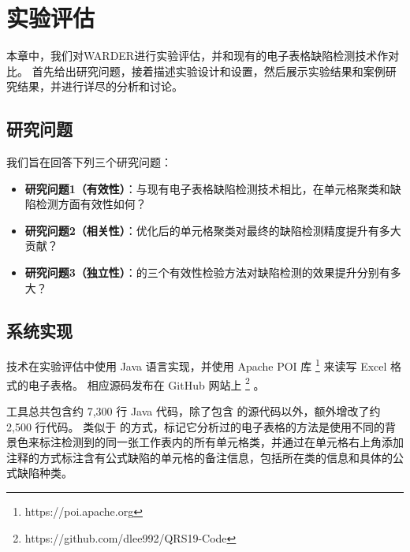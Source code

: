 \chapter{实验评估}

本章中，我们对WARDER进行实验评估，并和现有的电子表格缺陷检测技术作对比。
首先给出研究问题，接着描述实验设计和设置，然后展示实验结果和案例研究结果，并进行详尽的分析和讨论。


\section{研究问题}
我们旨在回答下列三个研究问题：
\begin{itemize}
    \item \textbf{研究问题1（有效性）}：与现有电子表格缺陷检测技术相比，\wa 在单元格聚类和缺陷检测方面有效性如何？
    \item \textbf{研究问题2（相关性）}：\wa 优化后的单元格聚类对最终的缺陷检测精度提升有多大贡献？
    \item \textbf{研究问题3（独立性）}：\wa 的三个有效性检验方法对缺陷检测的效果提升分别有多大？
\end{itemize}

\section{\wa 系统实现}
\wa 技术在实验评估中使用 Java 语言实现，并使用 Apache POI 库 \footnote{https://poi.apache.org} 来读写 Excel 格式的电子表格。
相应源码发布在 GitHub 网站上 \footnote{https://github.com/dlee992/QRS19-Code} 。

\wa 工具总共包含约 7,300 行 Java 代码，除了包含 \cu 的源代码以外，额外增改了约 2,500 行代码。
类似于 \cu 的方式，\wa 标记它分析过的电子表格的方法是使用不同的背景色来标注检测到的同一张工作表内的所有单元格类，并通过在单元格右上角添加注释的方式标注含有公式缺陷的单元格的备注信息，包括所在类的信息和具体的公式缺陷种类。





